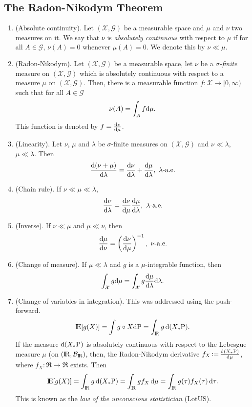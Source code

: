 \documentclass[a4paper,10pt]{article}
\begin{document}
\subsection{The Radon-Nikodym Theorem}
\begin{enumerate}
 \item (Absolute continuity).
       Let $(\mathcal{X}, \mathscr{G})$ be a measurable space and $\mu$ and $\nu$ two measures on it.
       We say that $\nu$ is \textit{absolutely continuous} with respect to $\mu$ if
       for all $A\in\mathscr{G}$, $\nu(A)=0$ whenever $\mu(A)=0$. We denote this by $\nu\ll\mu$.
 \item (Radon-Nikodym). Let $(\mathcal{X}, \mathscr{G})$ be a measurable space, let $\nu$ be a \textit{$\sigma$-finite}
       measure on $(\mathcal{X}, \mathscr{G})$ which is {absolutely continuous} with respect 
       to a measure $\mu$ on $(\mathcal{X}, \mathscr{G})$. Then, there is a measurable function $f:\mathcal{X}\to[0,\infty)$
       such that for all $A\in \mathcal{G}$
       \[
        \nu(A) = \int_A f \mathrm{d} \mu.
       \]
      This function is denoted by $f=\frac{\mathrm{d}\nu}{\mathrm{d} \mu}$.
 \item (Linearity). Let $\nu$, $\mu$ and $\lambda$ be $\sigma$-finite measures on $(\mathcal{X}, \mathscr{G})$ and $\nu\ll\lambda$, $\mu\ll\lambda$.
       Then
       \[
        \frac{\d(\nu+\mu)}{\d \lambda} = \frac{\d \nu}{\d \lambda} + \frac{\d \mu}{\d \lambda},\ \lambda\text{-a.e.}
       \]
 \item (Chain rule). If $\nu\ll\mu\ll\lambda$,
 \[
  \frac{\d\nu}{\d\lambda} = \frac{\d\nu}{\d\mu} \frac{\d\mu}{\d\lambda},\ \lambda\text{-a.e.} 
 \]
 \item (Inverse). If $\nu\ll\mu$ and $\mu\ll\nu$, then
 \[
  \frac{\mathrm{d} \mu}{\mathrm{d} \nu} = \left( \frac{\mathrm{d} \nu}{\mathrm{d} \mu}\right)^{-1},\ \nu\text{-a.e.}
 \]
 \item (Change of measure).
 If $\mu\ll\lambda$ and $g$ is a $\mu$-integrable function, then
 \[
  \int_{\mathcal{X}} g \mathrm{d} \mu = \int_{\mathcal{X}} g \frac{\mathrm{d} \mu}{\mathrm{d} \lambda}\mathrm{d} \lambda.
 \]
 \item (Change of variables in integration). This was addressed using the push-forward. 
 \[
  \E[g(X)] = \int g\circ X\d\prob = \int_\Re g \,\d(X_*\prob).
 \]
 If the measure $\mathrm{d}(X_*\mathrm{P})$ is absolutely continuous with respect to the Lebesgue 
 measure $\mu$ (on $(\Re, \B_\Re)$, then, the Radon-Nikodym derivative $f_X{}\mathop{\mathrel{:}=}{} \frac{\mathrm{d}(X_*\mathrm{P})}{\mathrm{d} \mu}$,
 where $f_X:\Re\to\Re$ exists. Then
 \[
  \E[g(X)] = \int_\Re g\, \d(X_*\prob) = \int_\Re g f_X\, \d\mu = \int_\Re g(\tau)f_X(\tau)\,\d \tau.
 \]
 This is known as the \textit{law of the unconscious statistician} (LotUS).

\end{enumerate}
\end{document}
